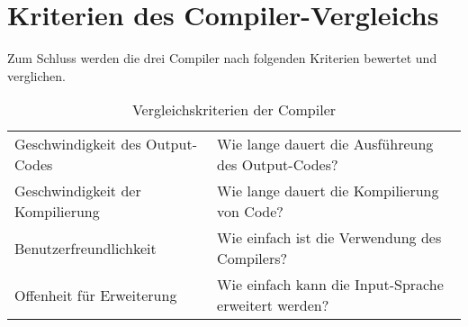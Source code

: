 \section{Kriterien des Compiler-Vergleichs}
Zum Schluss werden die drei Compiler nach folgenden Kriterien bewertet und verglichen.

\begin{table}[H]
    \centering
    \caption{Vergleichskriterien der Compiler}
    \vspace{3mm} %

    \begin{tabular}{l|l}
    Geschwindigkeit des Output-Codes    & Wie lange dauert die Ausführeung des Output-Codes?                \\
    Geschwindigkeit der Kompilierung    & Wie lange dauert die Kompilierung von Code?                       \\
    Benutzerfreundlichkeit              & Wie einfach ist die Verwendung des Compilers?                     \\
    Offenheit für Erweiterung           & Wie einfach kann die Input-Sprache erweitert werden?                                 
    \end{tabular}
\end{table}

